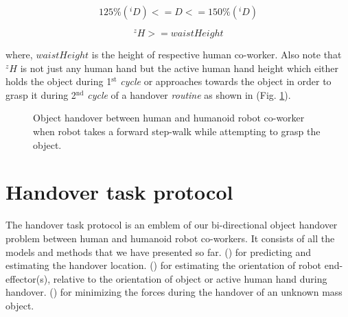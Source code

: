 \begin{equation}\label{triggerWalk}
		125\%({}^{i}D) <= D <= 150\%({}^{i}D)
\end{equation}

\begin{equation}\label{aboveWaist}
		{}^{z}H >= waistHeight
\end{equation}

where, $ waistHeight $ is the height of respective human co-worker. Also note that $ {}^{z}H $ is not just any human hand but the active human hand height which either holds the object during 1$ {}^\text{st} $ \textit{cycle} or approaches towards the object in order to grasp it during 2$ {}^\text{nd} $ \textit{cycle} of a handover \textit{routine} as shown in (Fig. \ref{fig:handoverWalk}).


\begin{figure}[hptb]
	\caption{Object handover between human and humanoid robot co-worker when robot takes a forward step-walk while attempting to grasp the object.}
	\label{fig:handoverWalk}
\end{figure}


\section{Handover task protocol}

The handover task protocol is an emblem of our bi-directional object handover problem between human and humanoid robot co-workers. It consists of all the models and methods that we have presented so far. () for predicting and estimating the handover location. () for estimating the orientation of robot end-effector(s), relative to the orientation of object or active human hand during handover. () for minimizing the forces during the handover of an unknown mass object.

